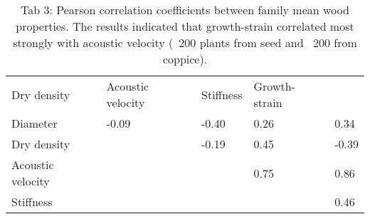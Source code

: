 \begin{table}
\centering
\caption{Tab 3: Pearson correlation coefficients between family mean wood properties. The results indicated that growth-strain correlated most strongly with acoustic velocity (~200 plants from seed and ~200 from coppice).}
\label{my-label}
\begin{tabular}{lllll}
Dry density       & Acoustic velocity & Stiffness & Growth-strain &       \\
Diameter          & -0.09             & -0.40     & 0.26          & 0.34  \\
Dry density       &                   & -0.19     & 0.45          & -0.39 \\
Acoustic velocity &                   &           & 0.75          & 0.86  \\
Stiffness         &                   &           &               & 0.46 
\end{tabular}
\end{table}